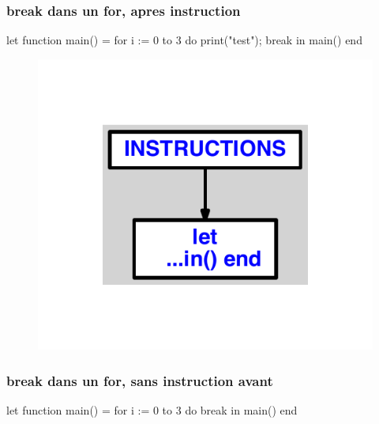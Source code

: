 \documentclass{article}
\begin{document}
\subsubsection{break dans un for, apres instruction}
\begin{verbatimtab}
let
	function main() =
		for i := 0 to 3 do
			print("test");
			break
in main() end
\end{verbatimtab}
\begin{figure}[H]\centering\includegraphics[max width=\textwidth]{ast/ast_9.pdf}\end{figure}\subsubsection{break dans un for, sans instruction avant}
\begin{verbatimtab}
let
	function main() =
		for i := 0 to 3 do
			break
in main() end
\end{verbatimtab}
\end{document}
